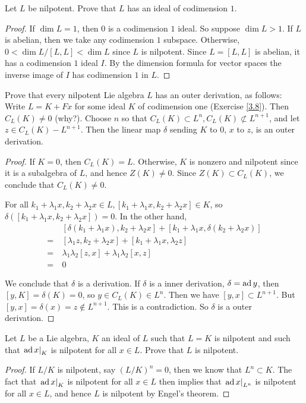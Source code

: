 \begin{ex}\label{3.8}
  Let $L$ be nilpotent. Prove that $L$ has an ideal of codimension $1$.
\end{ex}
\begin{proof}
  If $\dim L = 1$, then $0$ is a codimension $1$ ideal. So suppose $\dim L > 1$. If $L$ is abelian, then we take any codimension $1$ subspace. Otherwise, $0 < \dim L/[L,L] < \dim L$ since $L$ is nilpotent. Since $L=[L,L]$ is abelian, it has a codimension $1$ ideal $I$. By the dimension formula for vector spaces the inverse image of $I$ has codimension $1$ in $L$.
\end{proof}

\begin{ex}
  Prove that every nilpotent Lie algebra $L$ has an outer derivation, as follows: Write $L = K + Fx$ for some ideal $K$ of codimension one (Exercise \ref{3.8}). Then $C_L(K) \neq 0$ (why?). Choose $n$ so that $C_L(K) \subset L^n, C_L(K) \not\subset L^{n+1}$, and let $z \in C_L(K) - L^{n+1}$. Then the linear map $\delta$ sending $K$ to $0$, $x$ to $z$, is an outer derivation.
\end{ex}
\begin{proof}
  If $K = 0$, then $C_L(K) = L$. Otherwise, $K$ is nonzero and nilpotent since it is a subalgebra of $L$, and hence $Z(K) \neq 0$. Since $Z(K) \subset C_L(K)$, we conclude that $C_L(K) \neq 0$.

  For all $k_1 + \lambda_1x, k_2 + \lambda_2x \in L, [k_1 + \lambda_1x, k_2 + \lambda_2x] \in K$, so $\delta([k_1 + \lambda_1x, k_2 + \lambda_2x]) = 0$.
  In the other hand,
  \begin{align*}
   &\ [\delta(k_1 + \lambda_1x), k_2 + \lambda_2x] + [k_1 + \lambda_1x, \delta(k_2 + \lambda_2x)] \\
   =&\ [\lambda_1z, k_2 + \lambda_2x] + [k_1 + \lambda_1x, \lambda_2z] \\
   =&\ \lambda_1\lambda_2[z, x] + \lambda_1\lambda_2[x, z] \\
   =&\ 0
  \end{align*}

  We conclude that $\delta$ is a derivation.
  If $\delta$ is a inner derivation, $\delta = \operatorname{ad} y$, then $[y,K] = \delta(K) = 0$, so $y \in C_L(K) \in L^n$. Then we have $[y, x] \subset L^{n+1}$. But $[y, x] = \delta(x) = z \not\in L^{n+1}$. This is a contradiction. So $\delta$ is a outer derivation.
\end{proof}

\begin{ex}
  Let $L$ be a Lie algebra, $K$ an ideal of $L$ such that $L=K$ is nilpotent and such that $\left.{\operatorname{ad} x}\right|_{K}$ is nilpotent for all $x\in L$. Prove that $L$ is nilpotent.
\end{ex}
\begin{proof}
  If $L/K$ is nilpotent, say $(L/K)^n = 0$, then we know that $L^n \subset K$. The fact that $\left.{\operatorname{ad} x}\right|_{K}$ is nilpotent for all $x \in L$ then implies that $\left.{\operatorname{ad} x}\right|_{L^n}$ is nilpotent for all $x\in L$, and hence $L$ is nilpotent by Engel's theorem.
\end{proof}
